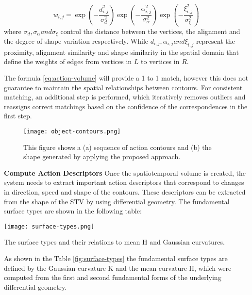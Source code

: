 \documentclass[11pt]{report}
\begin{document}
\begin{equation}
w_{i,j} = \exp(- \frac{d_{i,j}^2}{\sigma_d^2}) \exp(- \frac{\alpha_{i,j}^2}{\sigma_\alpha^2}) \exp(-\frac{\xi_{i,j}^2}{\sigma_\xi^2})
\label{eq:action-volume}
\end{equation}
where \( \sigma_d, \sigma_\alpha and \sigma_\xi \) control the distance between the vertices, the alignment and the degree of shape variation respectively. While \(d_{i,j}, \alpha_{i,j} and \xi_{i,j} \) represent the proximity, alignment similarity and shape similarity in the spatial domain that define the weights of edges from vertices in \(L\) to vertices in \(R\).

The formula \ref{eq:action-volume} will provide a 1 to 1 match, however this does not guarantee to maintain the spatial relationships between contours. For consistent matching, an additional step is performed, which iteratively removes outliers and reassigns correct matchings based on the confidence of the correspondences in the first step.\\

\begin{figure}
    \centering
    \texttt{[image: object-contours.png]}
    \caption{This figure shows a (a) sequence of action contours and (b) the shape generated by applying the proposed approach.}
    \label{fig:object-contours}
\end{figure}

\textbf{Compute Action Descriptors}
Once the spatiotemporal volume is created, the system needs to extract important action descriptors that correspond to changes in direction, speed and shape of the contours. These descriptors can be extracted from the shape of the STV by using differential geometry. The fundamental surface types are shown in the following table:\\ 

\begin{table}
    \centering
    \texttt{[image: surface-types.png]}
    \caption{The surface types and their relations to mean H and Gaussian curvatures.}
    \label{fig:surface-types}
\end{table}

As shown in the Table \ref{fig:surface-types} the fundamental surface types are defined by the Gaussian curvature K and the mean curvature H, which were computed from the first and second fundamental forms of the underlying differential geometry. \\
 
\end{document}
